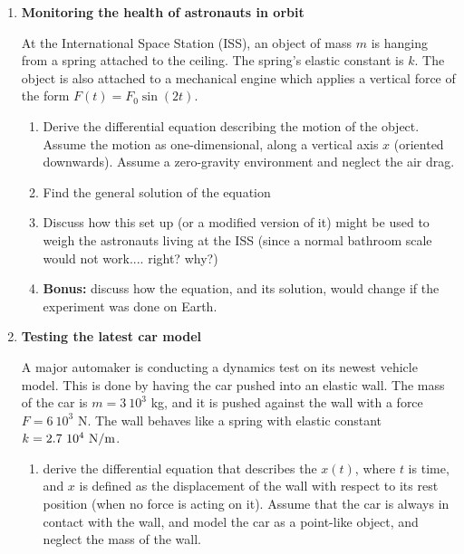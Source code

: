 \documentclass[fleqn]{article}
\begin{document}
  \begin{enumerate}


    \item {\bf Monitoring the health of astronauts in orbit}
    
    At the International Space Station (ISS), an object of mass $m$ is hanging from a spring attached to the ceiling. The spring's elastic constant is $k$. The object is also attached to a mechanical engine which applies a vertical force of the form $F(t)=F_0 \sin(2 t)$.  
    
      \begin{enumerate}
      \item Derive the differential equation describing the motion of the object. Assume the motion as one-dimensional, along a vertical axis $x$ (oriented downwards).  Assume a zero-gravity environment and neglect the air drag. 
      
      
      \item Find the general solution of the equation 
      
      \item Discuss how this set up (or a modified version of it) might be used to weigh the astronauts living at the ISS (since a normal bathroom scale would not work.... right? why?)
      
      \item  {\bf Bonus:} discuss how the equation, and its solution, would change if the experiment was done on Earth. 
      \end{enumerate}
    
    
    \item {\bf  Testing the latest car model}

    A major automaker is conducting a dynamics test on its newest vehicle model.  This is done by having the car pushed into an elastic wall. 
    The mass of the car is $m=3 ~10^3$ kg, and it is pushed against the wall with a force $F=6~10^3$ N. The wall behaves like a spring with elastic constant $k=2.7 ~10^4~{\rm N/m}$.  
    
      \begin{enumerate}
      \item derive the differential equation that describes the $x(t)$, where $t $ is time, and  $x$ is defined as the displacement of the wall with respect to its rest position (when no force is acting on it).  
      Assume that the car is always in contact with the wall, and model the car as a point-like object, and neglect the mass of the wall.  
      

\end{enumerate}
\end{enumerate}
\end{document}
